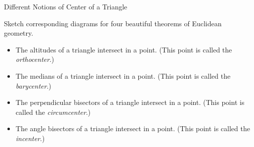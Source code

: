 \begin{exercise}{Different Notions of Center of a Triangle \Coffeecup}

Sketch corresponding diagrams for four beautiful theorems of Euclidean geometry.

\begin{itemize}

\item The altitudes of a triangle intersect in a point.  (This point is called the \emph{orthocenter}.)

\vspace*{2in}

\item The medians of a triangle intersect in a point.  (This point is called the \emph{barycenter}.)

\vspace*{2in}

\item The perpendicular bisectors of a triangle intersect in a point.  (This point is called the \emph{circumcenter}.)

\vspace*{2in}

\item The angle bisectors of a triangle intersect in a point.  (This point is called the \emph{incenter}.)

\vspace*{2in}

\end{itemize}
\end{exercise}

